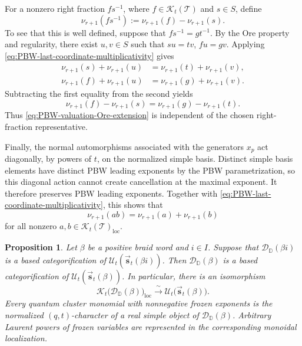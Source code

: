\documentclass[12pt, reqno]{amsart}
\theoremstyle{plain}
\newtheorem{proposition}[theorem]{Proposition}
\theoremstyle{definition}
\numberwithin{equation}{section}
\newcommand{\DD}{\mathbb{D}}
\begin{document}
For a nonzero right fraction \(fs^{-1}\), where
\(f\in\mathcal K_t(\mathscr T)\) and \(s\in S\), define
\begin{equation}\label{eq:PBW-valuation-Ore-extension}
    \nu_{r+1}(fs^{-1})
    :=
    \nu_{r+1}(f)-\nu_{r+1}(s).
\end{equation}
To see that this is well defined, suppose that
\(    fs^{-1}=gt^{-1}.
\)
By the Ore property and regularity, there exist \(u,v\in S\) such
that
\(
    su=tv\),
    \(    fu=gv.
\)
Applying
\eqref{eq:PBW-last-coordinate-multiplicativity} gives
\[
\begin{aligned}
    \nu_{r+1}(s)+\nu_{r+1}(u)
    &=
    \nu_{r+1}(t)+\nu_{r+1}(v),\\
    \nu_{r+1}(f)+\nu_{r+1}(u)
    &=
    \nu_{r+1}(g)+\nu_{r+1}(v).
\end{aligned}
\]
Subtracting the first equality from the second yields
\[
    \nu_{r+1}(f)-\nu_{r+1}(s)
    =
    \nu_{r+1}(g)-\nu_{r+1}(t).
\]
Thus \eqref{eq:PBW-valuation-Ore-extension} is independent of the
chosen right-fraction representative.

Finally, the normal automorphisms associated with the generators
\(x_p\) act diagonally, by powers of \(t\), on the normalized simple
basis. Distinct simple basis elements have distinct PBW leading
exponents by the PBW parametrization, so this diagonal action cannot
create cancellation at the maximal exponent. It therefore preserves
PBW leading exponents. Together with
\eqref{eq:PBW-last-coordinate-multiplicativity}, this shows that
\[
    \nu_{r+1}(ab)
    =
    \nu_{r+1}(a)+\nu_{r+1}(b)
\]
for all nonzero
\(a,b\in\mathcal K_t(\mathscr T)_{\mathrm{loc}}\).


\begin{proposition}
\label{pro:induction-upper-cluster-categorification}
Let \(\beta\) be a positive braid word and \(i\in I\). Suppose that
\(\mathscr D_{\DD}(\beta i)\) is a based categorification of
\(\mathcal U_t(\overrightarrow{\mathbf s}_t(\beta i))\). Then
\(\mathscr D_{\DD}(\beta)\) is a based categorification of
\(\mathcal U_t(\overrightarrow{\mathbf s}_t(\beta))\). In
particular, there is an isomorphism
\begin{equation}\label{eq:categorification-beta-i}
    \mathcal{K}_t\bigl(
        \mathscr D_{\DD}(\beta)
    \bigr)_{\mathrm{loc}}
    \xrightarrow{\ \sim\ }
    \mathcal U_t\bigl(
        \overrightarrow{\mathbf s}_t(\beta)
    \bigr).
\end{equation}
Every quantum cluster monomial with nonnegative frozen exponents is
the normalized \((q,t)\)-character of a real simple object of
\(\mathscr D_{\DD}(\beta)\). Arbitrary Laurent powers of frozen
variables are represented in the corresponding monoidal
localization.
\end{proposition}
\end{document}
